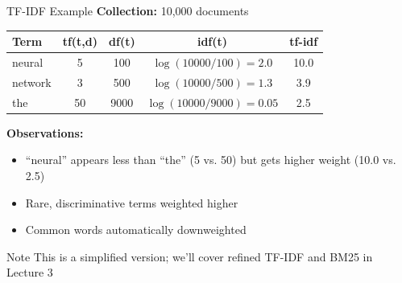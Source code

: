 \documentclass[aspectratio=169]{beamer}
\newif\ifanimated
\newcommand{\cpause}{\ifanimated\pause\fi}
\begin{document}
\begin{frame}[shrink=10]{TF-IDF Example}
\textbf{Collection:} 10,000 documents

\vspace{1em}

\begin{table}
\centering
\small
\begin{tabular}{lcccc}
\toprule
\textbf{Term} & \textbf{tf(t,d)} & \textbf{df(t)} & \textbf{idf(t)} & \textbf{tf-idf} \\
\midrule
neural & 5 & 100 & $\log(10000/100) = 2.0$ & 10.0 \\
network & 3 & 500 & $\log(10000/500) = 1.3$ & 3.9 \\
the & 50 & 9000 & $\log(10000/9000) = 0.05$ & 2.5 \\
\bottomrule
\end{tabular}
\end{table}

\vspace{1em}

\textbf{Observations:}
\begin{itemize}
    \item ``neural'' appears less than ``the'' (5 vs. 50) but gets higher weight (10.0 vs. 2.5)
    \item Rare, discriminative terms weighted higher
    \item Common words automatically downweighted
\end{itemize}
\cpause
\vspace{0.5em}

\begin{alertblock}{Note}
This is a simplified version; we'll cover refined TF-IDF and BM25 in Lecture 3
\end{alertblock}
\cpause
\end{frame}
\end{document}
